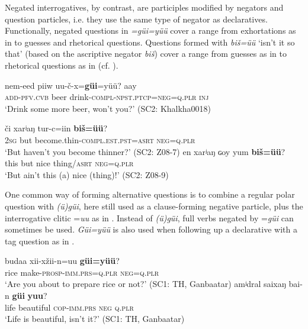 \documentclass[output=paper,colorlinks,citecolor=brown,chinesefont]{langscibook}
\begin{document}
Negated interrogatives, by contrast, are participles modified by negators and question particles, i.e. they use the same type of negator as declaratives. Functionally, negated questions in \textit{=güi=yüü} cover a range from exhortations as in  to guesses and rhetorical questions. Questions formed with \textit{biš=üü} ‘isn’t it so that’ (based on the ascriptive negator \textit{biš}) cover a range from guesses as in  to rhetorical questions as in  (cf. \citealt[14, 18]{Bjambasan2001}).

\ea\label{ex:kha:17}
    \gll nem-eed piiw uu-č-x=\textbf{güi}=yüü? aay \\ 
         \textsc{add-pfv.cvb} beer drink-\textsc{compl-npst.ptcp=neg=q.plr} \textsc{inj} \\
    \glt ‘Drink some more beer, won’t you?’ (SC2: Khalkha0018)
\z

\ea\label{ex:kha:18}
    \gll či xarʲaŋ tur-c=iin \textbf{biš=üü}? \\ 
         \textsc{2sg} but become.thin-\textsc{compl.est.pst=asrt} \textsc{neg=q.plr} \\
    \glt ‘But haven’t you become thinner?’ (SC2: Z08-7)
\z 
\ea\label{ex:kha:19}
    \gll en xarʲaŋ   ɢoy yum \textbf{biš=üü}? \\ 
          this but nice thing/\textsc{asrt} \textsc{neg=q.plr} \\
    \glt ‘But ain’t this (a) nice (thing)!’ (SC2: Z08-9)
\z 

One common way of forming alternative questions is to combine a regular polar question with \textit{(ü)güi}, here still used as a clause-forming negative particle, plus the interrogative clitic =\textit{uu} as in . Instead of \textit{(ü)güi}, full verbs negated by =\textit{güi} can sometimes be used. \textit{Güi=yüü} is also used when following up a declarative with a tag question as in .

\ea\label{ex:kha:20}
    \gll budaa xii-xžii-n=uu \textbf{güi=yüü}? \\ 
         rice make-\textsc{prosp-imm.prs=q.plr} \textsc{neg=q.plr} \\
    \glt ‘Are you about to prepare rice or not?’ (SC1: TH, Ganbaatar)
\z 
\ea\label{ex:kha:21}
    \gll amʲdral saixaŋ bai-n \textbf{güi} \textbf{yuu}? \\ 
         life beautiful \textsc{cop-imm.prs} \textsc{neg} \textsc{q.plr} \\
    \glt ‘Life is beautiful, isn’t it?’ (SC1: TH, Ganbaatar)
\z 
\end{document}
